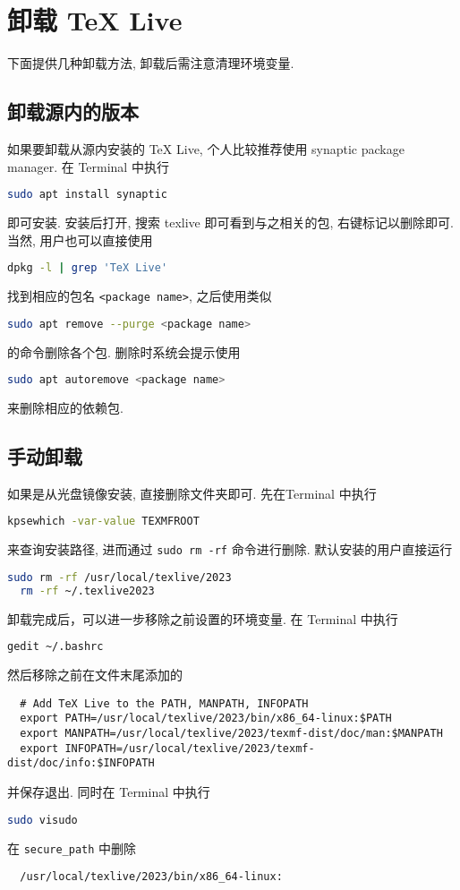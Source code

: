 \section{卸载 \TeX{} Live}\label{sec:ubuntu:uninstall}

下面提供几种卸载方法,
卸载后需注意清理环境变量.

\subsection{卸载源内的版本}

如果要卸载从源内安装的 \TeX{} Live, 个人比较推荐使用 synaptic package manager.
在 \textsf{Terminal} 中执行
\begin{lstlisting}[language = bash]
  sudo apt install synaptic
\end{lstlisting}
即可安装.
安装后打开, 搜索 \textsf{texlive} 即可看到与之相关的包, 右键标记以删除即可.
当然, 用户也可以直接使用
\begin{lstlisting}[language = bash]
  dpkg -l | grep 'TeX Live'
\end{lstlisting}
找到相应的包名 \texttt{<package name>}, 之后使用类似
\begin{lstlisting}[language = bash]
  sudo apt remove --purge <package name>
\end{lstlisting}
的命令删除各个包.
删除时系统会提示使用
\begin{lstlisting}[language = bash]
  sudo apt autoremove <package name>
\end{lstlisting}
来删除相应的依赖包.

\subsection{手动卸载}

如果是从光盘镜像安装,
直接删除文件夹即可.
先在\textsf{Terminal} 中执行
\begin{lstlisting}[language = bash]
  kpsewhich -var-value TEXMFROOT
\end{lstlisting}
来查询安装路径,
进而通过 \texttt{sudo rm -rf} 命令进行删除.
默认安装的用户直接运行
\begin{lstlisting}[language = bash]
  sudo rm -rf /usr/local/texlive/2023
  rm -rf ~/.texlive2023
\end{lstlisting}
卸载完成后，可以进一步移除之前设置的环境变量.
在 \textsf{Terminal} 中执行
\begin{lstlisting}[language = bash]
  gedit ~/.bashrc
\end{lstlisting}
然后移除之前在文件末尾添加的
\begin{lstlisting}
  # Add TeX Live to the PATH, MANPATH, INFOPATH
  export PATH=/usr/local/texlive/2023/bin/x86_64-linux:$PATH
  export MANPATH=/usr/local/texlive/2023/texmf-dist/doc/man:$MANPATH
  export INFOPATH=/usr/local/texlive/2023/texmf-dist/doc/info:$INFOPATH
\end{lstlisting}
并保存退出.
同时在 \textsf{Terminal} 中执行
\begin{lstlisting}[language = bash]
  sudo visudo
\end{lstlisting}
在 \texttt{secure\_path} 中删除
\begin{lstlisting}
  /usr/local/texlive/2023/bin/x86_64-linux:
\end{lstlisting}

